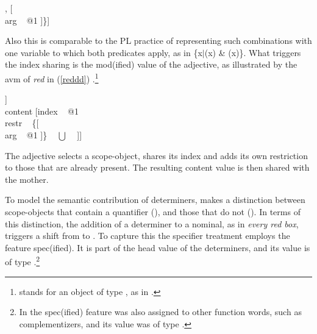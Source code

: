 \documentclass[output=paper]{langsci/langscibook}
\begin{document}
\begin{exe} 
\ex\label{redbox} 
\begin{avm}
[\type{scope-obj}         \\
 index ~ @1                \\
 restr ~ \{ [\type{red}   \\
             arg ~ @1 ],
            [   \\
             arg ~ @1 ]\}]
\end{avm}
\end{exe}

\noindent
Also this is comparable to the PL practice of representing such 
combinations with one variable to which both predicates apply, as in 
\{x$|$(x) \& (x)\}. What triggers the index sharing is 
the {\sc mod(ified)} value of the adjective, as illustrated by the {\sc avm} of 
\emph{red} in (\ref{reddd}) \citep[55]{ps2}.\footnote{\avmbox{$\Sigma$} 
stands for an object of type , as in \citet{GS00}.} 

\begin{exe} 
\ex\label{reddd}
\begin{avm}
[cat|head [\type{adjective}                               \\
           mod|loc|content [\type{scope-obj}            \\
                            index ~ @1                   \\
                            restr ~ \avmbox{$\Sigma$} ]] \\
 content [index ~ @1                                     \\
          restr ~ \{[                         \\
                     arg ~ @1 ]\} ~ $\bigcup$ ~ \avmbox{$\Sigma$} ]]
\end{avm}
\end{exe}

\noindent
The adjective selects a scope-object, shares its index and adds its own 
restriction to those that are already present. The resulting {\sc content} 
value is then shared with the mother.

To model the semantic contribution of determiners, \citet{GS00} 
makes a distinction between scope-objects that contain a quantifier 
(), and those that do not (). 
In terms of this distinction, the 
addition of a determiner to a nominal, as in \emph{every red box}, 
triggers a shift from  to . 
To capture this the specifier treatment employs the feature {\sc spec(ified)}. 
It is part of the {\sc head} value of the determiners, and its value is of type 
.\footnote{In \citet[45]{ps2} the {\sc spec(ified)}
feature was also assigned to other function words, such as complementizers, 
and its value was of type .}   
\end{document}
